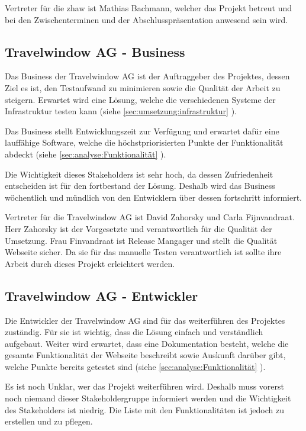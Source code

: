 Vertreter für die \gls{zhaw} ist Mathias Bachmann, welcher das Projekt betreut und bei den Zwischenterminen und der Abschlusspräsentation anwesend sein wird.

\subsection{Travelwindow AG - Business}
Das Business der Travelwindow AG ist der Auftraggeber des Projektes, dessen Ziel es ist, den Testaufwand zu minimieren sowie die Qualität der Arbeit zu steigern. Erwartet wird eine Lösung, welche die verschiedenen Systeme der Infrastruktur testen kann (siehe \cref{sec:umsetzung:infrastruktur} ).

Das Business stellt Entwicklungszeit zur Verfügung und erwartet dafür eine lauffähige Software, welche die höchstpriorisierten Punkte der Funktionalität abdeckt (siehe \cref{sec:analyse:Funktionalität} ).

Die Wichtigkeit dieses Stakeholders ist sehr hoch, da dessen Zufriedenheit entscheiden ist für den fortbestand der Lösung. Deshalb wird das Business wöchentlich und mündlich von den Entwicklern über dessen fortschritt informiert.

Vertreter für die Travelwindow AG ist David Zahorsky und Carla Fijnvandraat. Herr Zahorsky ist der Vorgesetzte und verantwortlich für die Qualität der Umsetzung. Frau Finvandraat ist Release Mangager und stellt die Qualität Webseite sicher. Da sie für das manuelle Testen verantwortlich ist sollte ihre Arbeit durch dieses Projekt erleichtert werden.

\subsection{Travelwindow AG - Entwickler}
Die Entwickler der Travelwindow AG sind für das weiterführen des Projektes zuständig. Für sie ist wichtig, dass die Lösung einfach und verständlich aufgebaut. Weiter wird erwartet, dass eine Dokumentation besteht, welche die gesamte Funktionalität der Webseite beschreibt sowie Auskunft darüber gibt, welche Punkte bereits getestet sind (siehe \cref{sec:analyse:Funktionalität} ).

Es ist noch Unklar, wer das Projekt weiterführen wird. Deshalb muss vorerst noch niemand dieser Stakeholdergruppe informiert werden und die Wichtigkeit des Stakeholders ist niedrig. Die Liste mit den Funktionalitäten ist jedoch zu erstellen und zu pflegen.

